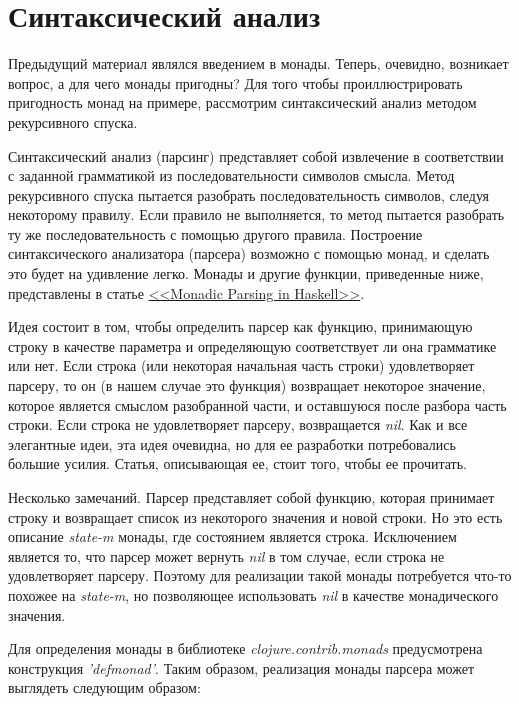 \documentclass[a4paper,12pt]{article}
\newcommand{\cl}[1] {{\it #1}}
\begin{document}
\section{Синтаксический анализ}\label{parsing}
Предыдущий материал являлся введением в монады. Теперь, очевидно, возникает
вопрос, а для чего монады пригодны? Для того чтобы проиллюстрировать пригодность
монад на примере, рассмотрим синтаксический анализ методом рекурсивного спуска. 

Синтаксический анализ (парсинг) представляет собой извлечение в соответствии с заданной грамматикой 
из последовательности символов смысла. Метод рекурсивного спуска пытается разобрать последовательность
символов, следуя некоторому правилу. Если правило не выполняется, то метод пытается
разобрать ту же последовательность с помощью другого правила. Построение синтаксического анализатора 
(парсера) возможно с помощью монад, и сделать это будет на удивление легко. Монады и другие функции, 
приведенные ниже, представлены в статье \href{http://www.cs.nott.ac.uk/~gmh/pearl.pdf}{<<Monadic Parsing in Haskell>>}. 

Идея состоит в том, чтобы определить парсер как функцию, принимающую строку в качестве параметра и определяющую соответствует ли она
грамматике или нет. Если строка (или некоторая начальная часть строки) удовлетворяет парсеру, то он (в нашем случае это функция) 
возвращает некоторое значение, которое является смыслом
разобранной части, и оставшуюся после разбора часть строки.
Если строка не удовлетворяет парсеру, возвращается \cl{nil}. Как и все элегантные идеи, эта идея очевидна,
но для ее разработки потребовались большие усилия. Статья, описывающая ее, стоит того, чтобы ее прочитать. 

Несколько замечаний. Парсер представляет собой функцию, которая принимает строку и возвращает список из некоторого
значения и новой строки. Но это есть описание \cl{state-m} монады, где состоянием является строка. Исключением является то, 
что парсер может вернуть \cl{nil} в том случае, если строка не удовлетворяет парсеру. Поэтому для реализации такой монады потребуется
что-то похожее на \cl{state-m}, но позволяющее использовать \cl{nil} в качестве монадического значения. 

Для определения монады в библиотеке \cl{clojure.contrib.monads} предусмотрена конструкция \cl{'defmonad'}. 
Таким образом, реализация монады парсера может выглядеть следующим образом:
\end{document}
